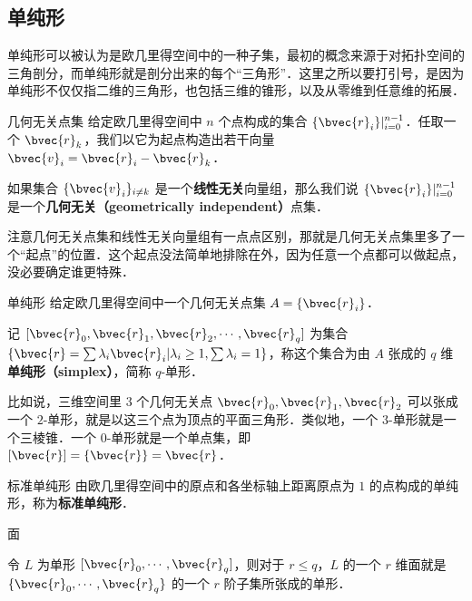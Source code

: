 

\subsection{单纯形}

单纯形可以被认为是欧几里得空间中的一种子集，最初的概念来源于对拓扑空间的三角剖分，而单纯形就是剖分出来的每个“三角形”．这里之所以要打引号，是因为单纯形不仅仅指二维的三角形，也包括三维的锥形，以及从零维到任意维的拓展．

\begin{definition}{几何无关点集}
给定欧几里得空间中 $n$ 个点构成的集合 $\{\bvec{r}_i\}|_{i=0}^{n-1}$．任取一个 $\bvec{r}_k$，我们以它为起点构造出若干向量 $\bvec{v}_i=\bvec{r}_i-\bvec{r}_k$．

如果集合 $\{\bvec{v}_i\}_{i\not= k}$ 是一个\textbf{线性无关}向量组，那么我们说 $\{\bvec{r}_i\}|_{i=0}^{n-1}$ 是一个\textbf{几何无关（geometrically independent）}点集．
\end{definition}

注意几何无关点集和线性无关向量组有一点点区别，那就是几何无关点集里多了一个“起点”的位置．这个起点没法简单地排除在外，因为任意一个点都可以做起点，没必要确定谁更特殊．

\begin{definition}{单纯形}
给定欧几里得空间中一个几何无关点集 $A=\{\bvec{r}_i\}$．

记 $[\bvec{r}_0, \bvec{r}_1, \bvec{r}_2, \cdots, \bvec{r}_q]$ 为集合 $\{\bvec{r}=\sum\lambda_i\bvec{r}_i|\lambda_i\geq 1, \sum\lambda_i=1\}$，称这个集合为由 $A$ 张成的 $q$ 维\textbf{单纯形（simplex）}，简称 $q$-单形．

\end{definition}

比如说，三维空间里 $3$ 个几何无关点 $\bvec{r}_0, \bvec{r}_1, \bvec{r}_2$ 可以张成一个 $2$-单形，就是以这三个点为顶点的平面三角形．类似地，一个 $3$-单形就是一个三棱锥．一个 $0$-单形就是一个单点集，即 $[\bvec{r}]=\{\bvec{r}\}=\bvec{r}$．


\begin{definition}{标准单纯形}
由欧几里得空间中的原点和各坐标轴上距离原点为 $1$ 的点构成的单纯形，称为\textbf{标准单纯形}．
\end{definition}



\begin{definition}{面}

令 $L$ 为单形 $[\bvec{r}_0, \cdots, \bvec{r}_q]$，则对于 $r\leq q$，$L$ 的一个 $r$ 维面就是 $\{\bvec{r}_0, \cdots, \bvec{r}_q\}$ 的一个 $r$ 阶子集所张成的单形．

\end{definition}


